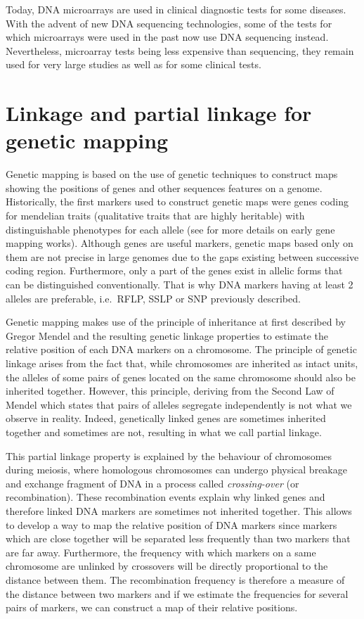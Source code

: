 \documentclass[]{book}
\begin{document}
Today, DNA microarrays are used in clinical diagnostic tests for some
diseases. With the advent of new DNA sequencing technologies, some of
the tests for which microarrays were used in the past now use DNA
sequencing instead. Nevertheless, microarray tests being less expensive
than sequencing, they remain used for very large studies as well as for
some clinical tests.

\hypertarget{linkage}{%
\section{Linkage and partial linkage for genetic mapping}\label{linkage}}

Genetic mapping is based on the use of genetic techniques to construct
maps showing the positions of genes and other sequences features on a
genome. Historically, the first markers used to construct genetic maps
were genes coding for mendelian traits (qualitative traits that are
highly heritable) with distinguishable phenotypes for each allele (see
\citep{sturtevant_history_2001} for more details on early gene mapping
works). Although genes are useful markers, genetic maps based only on
them are not precise in large genomes due to the gaps existing between
successive coding region. Furthermore, only a part of the genes exist in
allelic forms that can be distinguished conventionally. That is why DNA
markers having at least 2 alleles are preferable, i.e.~RFLP, SSLP or SNP
previously described.

Genetic mapping makes use of the principle of inheritance at first
described by Gregor Mendel \citep{mendel_1865_experiments} and the resulting
genetic linkage properties to estimate the relative position of each DNA
markers on a chromosome. The principle of genetic linkage arises from
the fact that, while chromosomes are inherited as intact units, the
alleles of some pairs of genes located on the same chromosome should
also be inherited together. However, this principle, deriving from the
Second Law of Mendel which states that pairs of alleles segregate
independently is not what we observe in reality. Indeed, genetically
linked genes are sometimes inherited together and sometimes are not,
resulting in what we call partial linkage.

This partial linkage property is explained by the behaviour of
chromosomes during meiosis, where homologous chromosomes can undergo
physical breakage and exchange fragment of DNA in a process called
\emph{crossing-over} (or recombination). These recombination events explain
why linked genes and therefore linked DNA markers are sometimes not
inherited together. This allows to develop a way to map the relative
position of DNA markers since markers which are close together will be
separated less frequently than two markers that are far away.
Furthermore, the frequency with which markers on a same chromosome are
unlinked by crossovers will be directly proportional to the distance
between them. The recombination frequency is therefore a measure of the
distance between two markers and if we estimate the frequencies for
several pairs of markers, we can construct a map of their relative
positions.
\end{document}
